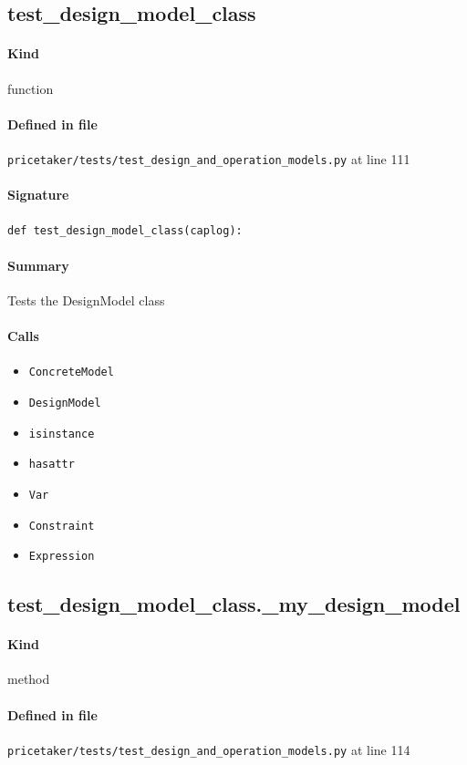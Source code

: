 \documentclass[11pt]{report}
\begin{document}
\subsection{test\_design\_model\_class}
\label{def:pricetaker-tests-test_design_and_operation_models.py:test_design_model_class:L111}
\paragraph{Kind} function
\paragraph{Defined in file} \texttt{pricetaker/tests/test\_design\_and\_operation\_models.py} at line 111
\paragraph{Signature} \texttt{def test\_design\_model\_class(caplog):}
\paragraph{Summary} Tests the DesignModel class
\paragraph{Calls}
\begin{itemize}[leftmargin=*]
  \item \texttt{ConcreteModel}
  \item \texttt{DesignModel}
  \item \texttt{isinstance}
  \item \texttt{hasattr}
  \item \texttt{Var}
  \item \texttt{Constraint}
  \item \texttt{Expression}
\end{itemize}
\subsection{test\_design\_model\_class.\_my\_design\_model}
\label{def:pricetaker-tests-test_design_and_operation_models.py:test_design_model_class._my_design_model:L114}
\paragraph{Kind} method
\paragraph{Defined in file} \texttt{pricetaker/tests/test\_design\_and\_operation\_models.py} at line 114
\end{document}
